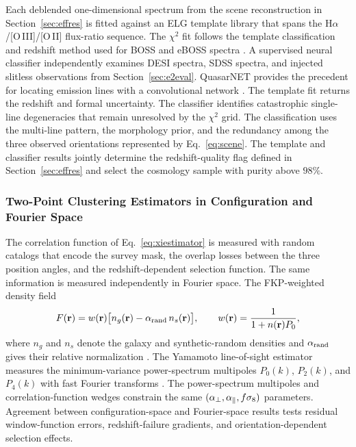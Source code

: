 Each deblended one-dimensional spectrum from the scene reconstruction in Section~\ref{sec:effres} is fitted against an ELG template library that spans the H$\alpha$/[O\,III]/[O\,II] flux-ratio sequence. The $\chi^2$ fit follows the template classification and redshift method used for BOSS and eBOSS spectra \cite{bolton2012}. A supervised neural classifier independently examines DESI spectra, SDSS spectra, and injected slitless observations from Section~\ref{sec:e2eval}. QuasarNET provides the precedent for locating emission lines with a convolutional network \cite{quasarnet2018}. The template fit returns the redshift and formal uncertainty. The classifier identifies catastrophic single-line degeneracies that remain unresolved by the $\chi^2$ grid. The classification uses the multi-line pattern, the morphology prior, and the redundancy among the three observed orientations represented by Eq.~\eqref{eq:scene}. The template and classifier results jointly determine the redshift-quality flag defined in Section~\ref{sec:effres} and select the cosmology sample with purity above $98\%$.

\subsubsection{Two-Point Clustering Estimators in Configuration and Fourier Space}

The correlation function of Eq.~\eqref{eq:xiestimator} is measured with random catalogs that encode the survey mask, the overlap losses between the three position angles, and the redshift-dependent selection function. The same information is measured independently in Fourier space. The FKP-weighted density field
\begin{equation}
  F(\mathbf{r}) = w(\mathbf{r})\big[n_g(\mathbf{r})-\alpha_{\rm rand}\,n_s(\mathbf{r})\big],
  \qquad
  w(\mathbf{r}) = \frac{1}{1+n(\mathbf{r})P_0},
  \label{eq:fkp}
\end{equation}
where $n_g$ and $n_s$ denote the galaxy and synthetic-random densities and $\alpha_{\rm rand}$ gives their relative normalization \cite{fkp1994}. The Yamamoto line-of-sight estimator measures the minimum-variance power-spectrum multipoles $P_0(k)$, $P_2(k)$, and $P_4(k)$ with fast Fourier transforms \cite{yamamoto2006,hand2017nbodykit}. The power-spectrum multipoles and correlation-function wedges constrain the same $(\alpha_\perp,\alpha_\parallel,f\sigma_8)$ parameters. Agreement between configuration-space and Fourier-space results tests residual window-function errors, redshift-failure gradients, and orientation-dependent selection effects.

